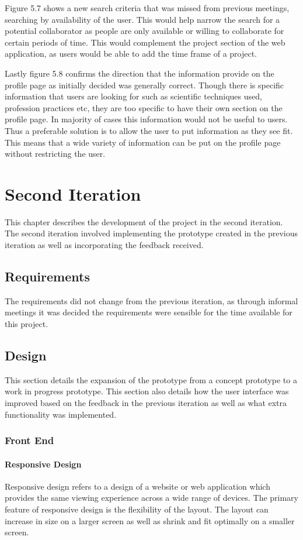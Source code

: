\documentclass[a4paper,oneside,11pt]{report}
\begin{document}
Figure 5.7 shows a new search criteria that was missed from previous meetings, searching by availability of the user. This would help narrow the search for a potential collaborator as people are only available or willing to collaborate for certain periods of time. This would complement the project section of the web application, as users would be able to add the time frame of a project.

Lastly figure 5.8 confirms the direction that the information provide on the profile page as initially decided was generally correct. Though there is specific information that users are looking for such as scientific techniques used, profession practices etc, they are too specific to have their own section on the profile page. In majority of cases this information would not be useful to users. Thus a preferable solution is to allow the user to put information as they see fit. This means that a wide variety of information can be put on the profile page without restricting the user.
\chapter{Second Iteration}
This chapter describes the development of the project in the second iteration. The second iteration involved implementing the prototype created in the previous iteration as well as incorporating the feedback received.
\section{Requirements}
The requirements did not change from the previous iteration, as through informal meetings it was decided the requirements were sensible for the time available for this project.
\section{Design}
This section details the expansion of the prototype from a concept prototype to a work in progress prototype. This section also details how the user interface was improved based on the feedback in the previous iteration as well as what extra functionality was implemented.
\pagebreak
\subsection{Front End}
\subsubsection{Responsive Design}
Responsive design refers to a design of a website or web application which provides the same viewing experience across a wide range of devices. The primary feature of responsive design is the flexibility of the layout. The layout can increase in size on a larger screen as well as shrink and fit optimally on a smaller screen.
\end{document}
